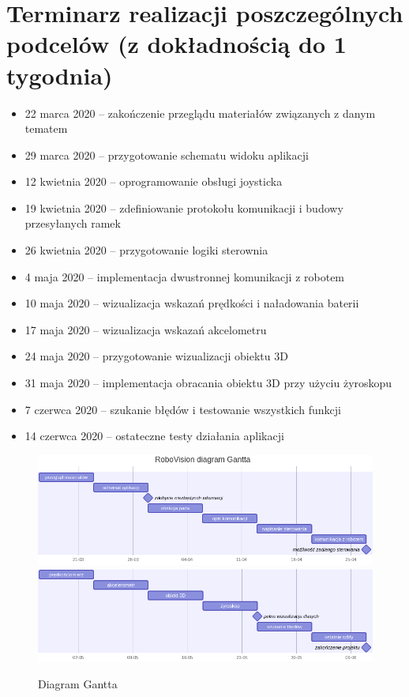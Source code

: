 \documentclass[12pt,a4paper,polish]{article}
\begin{document}
  \newpage
  \section{Terminarz realizacji poszczególnych podcelów 
     {\small (z dokładnością do 1 tygodnia)}}

  \begin{itemize}
    \item 22 marca 2020  -- zakończenie przeglądu materiałów
                            związanych z danym tematem
    \item 29 marca 2020 -- przygotowanie schematu widoku aplikacji
    \item 12 kwietnia 2020 -- oprogramowanie obsługi joysticka
    \item 19 kwietnia 2020 -- zdefiniowanie protokołu komunikacji i budowy przesyłanych ramek
    \item 26 kwietnia 2020 -- przygotowanie logiki sterownia
    \item  4 maja 2020 -- implementacja dwustronnej komunikacji z robotem
    \item 10 maja 2020 -- wizualizacja wskazań prędkości i naładowania baterii
    \item 17 maja 2020 -- wizualizacja wskazań akcelometru
    \item 24 maja 2020 -- przygotowanie wizualizacji obiektu 3D
    \item 31 maja 2020 -- implementacja obracania obiektu 3D przy użyciu żyroskopu
    \item  7 czerwca 2020 -- szukanie błędów i testowanie wszystkich funkcji
    \item 14 czerwca 2020 -- ostateczne testy działania aplikacji
  \end{itemize}

  \begin{figure}[ht]
    \centering
    \includegraphics[width=1\textwidth]{img/gantt1.png}
    \includegraphics[width=1\textwidth]{img/gantt2.png}
    \caption{Diagram Gantta}
    \label{fig:ogniwa}
  \end{figure}
\end{document}
